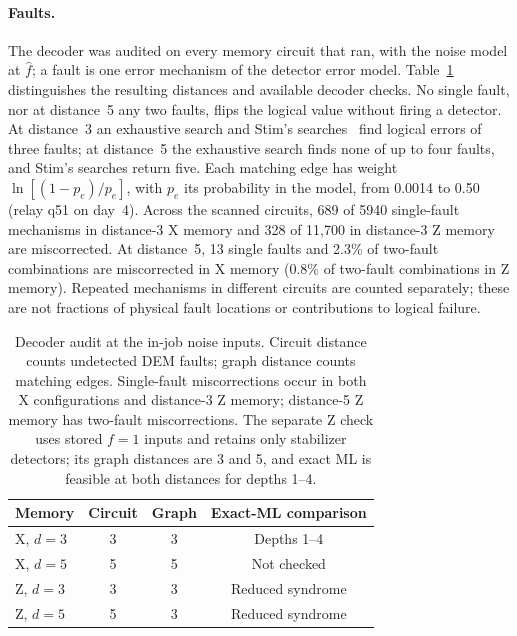 \documentclass[aps,pra,reprint,nofootinbib,longbibliography,floatfix,showkeys]{revtex4-2}
\newcommand{\fhat}{\hat f}
\begin{document}
\paragraph*{Faults.}
The decoder was audited on every memory circuit that ran, with the noise model at $\fhat$; a fault is one error mechanism of the detector error model.
Table~\ref{tab:decoder} distinguishes the resulting distances and available decoder checks.
No single fault, nor at distance~5 any two faults, flips the logical value without firing a detector.
At distance~3 an exhaustive search and Stim's searches~\cite{stim116} find logical errors of three faults; at distance~5 the exhaustive search finds none of up to four faults, and Stim's searches return five.
Each matching edge has weight $\ln[(1-p_e)/p_e]$, with $p_e$ its probability in the model, from 0.0014 to 0.50 (relay q51 on day~4).
Across the scanned circuits, 689 of 5940 single-fault mechanisms in distance-3 X memory and 328 of 11,700 in distance-3 Z memory are miscorrected.
At distance~5, 13 single faults and 2.3\% of two-fault combinations are miscorrected in X memory (0.8\% of two-fault combinations in Z memory).
Repeated mechanisms in different circuits are counted separately; these are not fractions of physical fault locations or contributions to logical failure.

\begin{table}[tb]
\caption{Decoder audit at the in-job noise inputs. Circuit distance counts undetected DEM faults; graph distance counts matching edges.
Single-fault miscorrections occur in both X configurations and distance-3 Z memory; distance-5 Z memory has two-fault miscorrections.
The separate Z check uses stored $f=1$ inputs and retains only stabilizer detectors; its graph distances are 3 and 5, and exact ML is feasible at both distances for depths 1--4.}
\label{tab:decoder}
\footnotesize
\setlength{\tabcolsep}{4pt}
\begin{ruledtabular}
\begin{tabular}{lccc}
Memory & Circuit & Graph & Exact-ML comparison \\
\hline
X, $d=3$ & 3 & 3 & Depths 1--4 \\
X, $d=5$ & 5 & 5 & Not checked \\
Z, $d=3$ & 3 & 3 & Reduced syndrome \\
Z, $d=5$ & 5 & 3 & Reduced syndrome \\
\end{tabular}
\end{ruledtabular}
\end{table}
\end{document}
